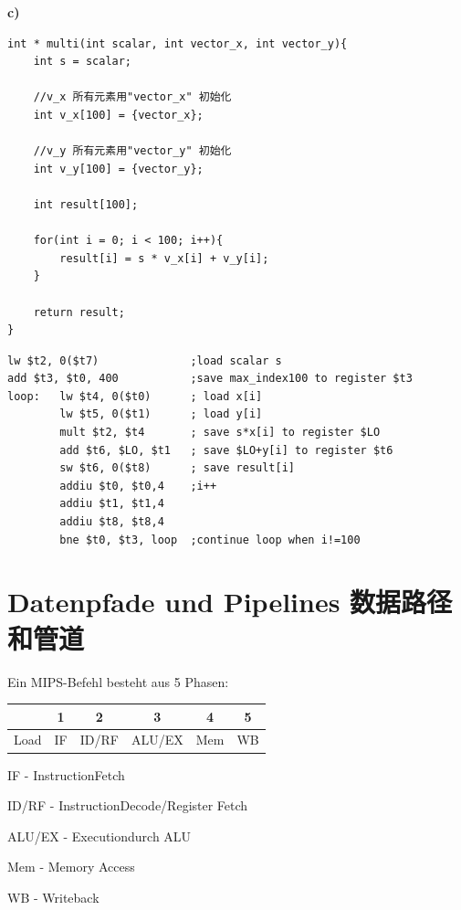 \documentclass[fleqn]{article}
\begin{document}
\noindent\textbf{c)}

\begin{lstlisting}
int * multi(int scalar, int vector_x, int vector_y){
    int s = scalar;     

    //v_x 所有元素用"vector_x" 初始化
    int v_x[100] = {vector_x};

    //v_y 所有元素用"vector_y" 初始化
    int v_y[100] = {vector_y};

    int result[100];

    for(int i = 0; i < 100; i++){
        result[i] = s * v_x[i] + v_y[i];
    }

    return result;
}    
\end{lstlisting}

\begin{lstlisting}
lw $t2, 0($t7)              ;load scalar s
add $t3, $t0, 400           ;save max_index100 to register $t3
loop:   lw $t4, 0($t0)      ; load x[i]
        lw $t5, 0($t1)      ; load y[i]
        mult $t2, $t4       ; save s*x[i] to register $LO
        add $t6, $LO, $t1   ; save $LO+y[i] to register $t6
        sw $t6, 0($t8)      ; save result[i]
        addiu $t0, $t0,4    ;i++
        addiu $t1, $t1,4
        addiu $t8, $t8,4
        bne $t0, $t3, loop  ;continue loop when i!=100
\end{lstlisting}






\section{Datenpfade und Pipelines 数据路径和管道}

\noindent Ein MIPS-Befehl besteht aus 5 Phasen:

\begin{center}
    \begin{tabular}{|c|c|c|c|c|c|}
        \hline
        &1&2&3&4&5\\
        \hline
        Load&IF&ID/RF&ALU/EX&Mem&WB\\
        \hline
    \end{tabular}
\end{center}

IF - InstructionFetch

ID/RF - InstructionDecode/Register Fetch

ALU/EX - Executiondurch ALU

Mem - Memory Access

WB - Writeback
\end{document}
